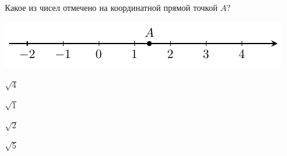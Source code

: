 \begin{ex}
	\begin{condition}
		Какое из чисел отмечено на координатной прямой точкой $A$?
		\begin{center}
		\includegraphics{graphs/graph_5/graph_5}
		\end{center}
		
		\selectanswer
		\begin{enumcols}[columns=4]
			\item $\sqrt{4}$
			\item $\sqrt{1}$
			\item $\sqrt{2}$
			\item $\sqrt{5}$
		\end{enumcols}
	\end{condition}
\end{ex}